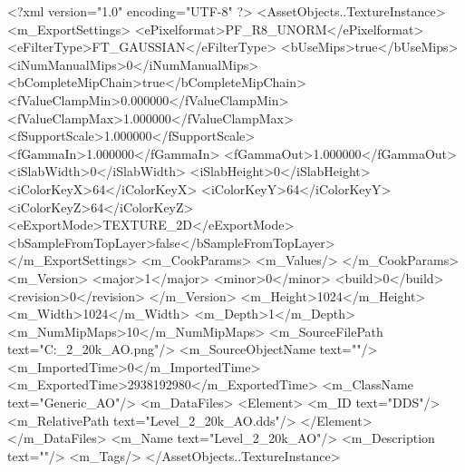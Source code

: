 <?xml version="1.0" encoding="UTF-8" ?>
<AssetObjects..TextureInstance>
	<m_ExportSettings>
		<ePixelformat>PF_R8_UNORM</ePixelformat>
		<eFilterType>FT_GAUSSIAN</eFilterType>
		<bUseMips>true</bUseMips>
		<iNumManualMips>0</iNumManualMips>
		<bCompleteMipChain>true</bCompleteMipChain>
		<fValueClampMin>0.000000</fValueClampMin>
		<fValueClampMax>1.000000</fValueClampMax>
		<fSupportScale>1.000000</fSupportScale>
		<fGammaIn>1.000000</fGammaIn>
		<fGammaOut>1.000000</fGammaOut>
		<iSlabWidth>0</iSlabWidth>
		<iSlabHeight>0</iSlabHeight>
		<iColorKeyX>64</iColorKeyX>
		<iColorKeyY>64</iColorKeyY>
		<iColorKeyZ>64</iColorKeyZ>
		<eExportMode>TEXTURE_2D</eExportMode>
		<bSampleFromTopLayer>false</bSampleFromTopLayer>
	</m_ExportSettings>
	<m_CookParams>
		<m_Values/>
	</m_CookParams>
	<m_Version>
		<major>1</major>
		<minor>0</minor>
		<build>0</build>
		<revision>0</revision>
	</m_Version>
	<m_Height>1024</m_Height>
	<m_Width>1024</m_Width>
	<m_Depth>1</m_Depth>
	<m_NumMipMaps>10</m_NumMipMaps>
	<m_SourceFilePath text="C:\Users\Shadow\Desktop\Prototypes\Level_2_20k_AO.png"/>
	<m_SourceObjectName text=""/>
	<m_ImportedTime>0</m_ImportedTime>
	<m_ExportedTime>2938192980</m_ExportedTime>
	<m_ClassName text="Generic_AO"/>
	<m_DataFiles>
		<Element>
			<m_ID text="DDS"/>
			<m_RelativePath text="Level_2_20k_AO.dds"/>
		</Element>
	</m_DataFiles>
	<m_Name text="Level_2_20k_AO"/>
	<m_Description text=""/>
	<m_Tags/>
</AssetObjects..TextureInstance>


